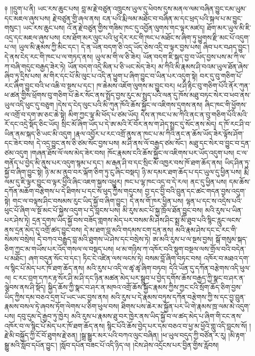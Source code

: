 \documentclass{article}
\begin{document}
༈ །།དྲུག་པ་ནི། ཡང་རས་ཆུང་པས། བླ་མ་རྗེ་བཙུན་འཁྲུངས་ཡུལ་དུ་ཕེབས་དུས་མནལ་ལམ་བཞིན་བྱུང་ངམ་ཡུམ་དང་མཇལ་ཞུས་པས། རྗེ་བཙུན་གྱི་ཞལ་ནས། ངན་པའི་རྨི་ལམ་མཐོང་བ་བཞིན་མ་དང་ཕྲད་པའི་སྐལ་པ་མ་བྱུང་གསུང་། ཡང་རས་ཆུང་པས། འོ་ན་རྗེ་བཙུན་གྱིས་གཟིམ་ཁང་དུ་འབྱོན་ལུགས་གང་ལྟར་མཛད། ཐོག་མར་ཡུལ་མི་ཇི་འདྲ་དང་མཇལ་ཞུས་པས། ངས་ཐོག་མར་ལུང་པའི་ཕུ་དེར་རང་གི་ཁང་པ་མཐོང་ས་ཞིག་ཏུ་ཕྱུགས་རྫི་མང་པོ་འདུག་པ་ལ། ཡུལ་མི་རྣམས་ཀྱི་མིང་དང་། དེ་ན་ཡོན་བདག་ཅི་འདྲ་ཡོད་ཅེས་འདྲི་བ་ལྟར་བྱས་པས། ཞིབ་པར་བཤད་བྱུང་། དེ་ནས་ངེད་རང་གི་ཁང་པ་ལ་གཏད་ནས། ཡུལ་མ་གི་ལ་ཅི་ཟེར། ཡོན་བདག་ཇི་སྐད་བྱ་བ་ཡོད་བྱས་པས་མ་ཀི་ལ་ཀ་བཞི་གདུང་བརྒྱད་ཟེར་ཏེ། ཡོན་བདག་འདྲེ་མིན་པ་ཅི་ཡང་མེད་ཟེར། མ་ཀིའི་མི་རྣམས་ཤི་བའམ་ཡུལ་ཐོན་ཞེས་ཞིབ་ཏུ་དྲིས་པས། མ་གིར་དང་པོ་མི་ལུང་པ་འདི་ན་ཕྱུག་པ་ཞིག་བྱུང་བ་ཡིན་པར་འདུག་སྟེ། བར་དུ་བུ་གཅིག་པོ་རང་ཞིག་བྱུང་བའི་ཕ་འཆི་བ་སྔས་པ་དང་། ཁ་ཆེམས་འཇོག་ལུགས་མ་བྱུང་བར། ཕ་ཤི་རྟིང་བུ་གཅིག་པོའི་ནོར་ཀུན་ཕ་ཚན་གྱིས་ཕྲོགས་བུ་གཅིག་པོ་ཆེར་སོང་ནས་སྤྲོད་བྱས་རུང་མ་སྤྲད་པའི་ལན་དུ་ཁོས་མཐུ་བཏང་སེར་བ་ཕབ་ནས་ཡུལ་འདི་ཕུང་དུ་བཅུག །དེས་ད་ངེད་ལུང་པའི་མི་ཀུན་ཁོའི་ཆོས་སྐྱོང་ལ་འཇིགས་དྲགས་ནས། ཞིང་ཁང་གི་ཕྱོགས་ལ་འགྲོ་བ་དག་ཨ་ཅང་ཆེ་སྟེ། མིག་ཀྱང་ལྟ་མི་ཕོད་པ་ཙམ་ཡོད། དེས་ན་ཁང་པ་མ་ཀིའི་ནང་ན་བུ་གཅིག་པོའི་མའི་རོ་དང་འདྲེ་སྡོད་ཅིང་ཡོད། སྲིང་མོ་ཞིག་ཡོད་པ་དེ་ཨ་མའི་རོ་བོར་ནས་ག་ཤེད་སྤྲང་དུ་སོང་ནས་མེད། ད་ཁོ་རང་ཤི་བ་ཡིན་ནམ་སྐད་ཅི་ཡང་མི་འདུག །རྣལ་འབྱོར་པ་རང་འགྲོ་ནུས་ན་ཁང་པ་མ་ཀིའི་ནང་ན་ཆོས་ཡོད་ཟེར་ལྟོས་ཤོག་དང་ཟེར་བས། དེ་འདྲ་བྱུང་ནས་ཅི་ཙམ་སོང་བྱས་པས། མ་ཤི་ནས་ལོ་བརྒྱད་ཙམ་སོང་། མཐུ་དང་སེར་བ་བྱུང་བ་དྲན་ཙམ་འདུག །གཞན་ཐོས་ལོ་ལས་མེད་ཟེར་བས། ཁོང་རྣམས་ངའི་ཆོས་སྐྱོང་ལ་འཇིགས་པར་ཡོད་འདུག་པས། ང་ལ་གནོད་པ་བྱེད་མི་ནུས་པར་འདུག་སྙམ་པ་དང་། མ་རྒན་ཤི་བ་དང་སྲིང་མོ་འཁྱར་བས་ཁོ་ཐག་ཆོད་ནས། ཡིད་ཤིན་ཏུ་སྐྱོ་བ་ཞིག་བྱུང་སྟེ། ཉི་མ་མ་ནུབ་བར་ལྐོག་ཅིག་ཏུ་ངུ་ཞིང་བསྡད། ཉི་མ་དམར་ཐག་ཆོད་པ་དང་ཡུལ་དུ་ཕྱིན་པས། རྨི་ལམ་དུ་ཇི་ལྟར་བྱུང་བ་ལྟར་ཕྱིའི་ཞིང་འཇག་སྐྱས་འཕྱུར། ཁང་པ་ལྷ་ཁང་འདྲ་བ་དེ་རལ། ནང་དུ་ཕྱིན་པས། དམ་ཆོས་དཀོན་མཆོག་བརྩེགས་པ་དེ་ཐིགས་པ་དང་ས་ཕུད་ཀྱིས་གདུངས། བྱ་དང་བྱི་བའི་བྲུན་དང་ཚང་གདན་བྱས་འདུག་སྟེ། གང་ལ་བལྟས་ཤིང་བསམས་རུང་ཡིད་སྐྱོ་བ་ཞིག་བྱུང་། དེ་ནས་གོ་ཁར་ཕྱིན་པས། ལྷན་པ་དང་ས་འདྲེས་པའི་ཕུང་པོ་ཞིག་ལ་སྔོ་མང་པོ་སྐྱེས་འདུག་པ་དེ་བླངས་པས། མི་རུས་མང་པོ་སྐྱ་ཁྲོལ་ཐོན་བྱུང་བས། མའི་རུས་པ་ཡིན་པར་ཤེས་ཏེ། དྲན་དྲགས་ཡིད་སྐྱོ་བས་བཟོད་གླགས་མེད་པར་བསམ་མི་ཤེས་ཤིང་སྨྲ་མི་ཐུབ་པའི་སྙིང་རླུང་ལངས་ནས་དྲན་མེད་དུ་འགྲོ་ཚད་བྱུང་བས། དེ་མ་ཐག་བླ་མའི་གདམས་ངག་དྲན་ནས། མའི་རྣམ་ཤེས་དང་ང་རང་གི་སེམས་བསྲེས། དེ་བཀའ་བརྒྱུད་བླ་མའི་ཐུགས་ཡེ་ཤེས་དང་བསྲེས་ཏེ། ཨ་མའི་རུས་པ་ལ་སྔས་བྱས། སྒོ་གསུམ་སྐད་ཅིག་ཀྱང་མ་གཡོས་པར་འོད་གསལ་ལ་བསྡད་པས། ཕ་མ་གཉིས་ཀ་འཁོར་བའི་སྡུག་བསྔལ་ལས་གྲོལ་བའི་བདེན་པ་མཐོང་། ཞག་བདུན་སོང་བ་དང་། ཏིང་ངེ་འཛིན་ལས་ལངས་ཏེ། བསམ་བློ་ཞིག་བཏང་བས། འཁོར་བ་མཐའ་དག་ལ་སྙིང་པོ་མེད་པར་ཁོ་ཐག་ཆོད་ནས། མའི་རུས་པ་འདི་ལ་ཚྭ་ཚྭ་ཞིག་བཏབ། དེའི་ཡོན་དུ་དཀོན་བརྩེགས་འདི་ཕུལ་ལ། ང་རང་བྲག་དཀར་རྟ་སོར་ཤི་མ་ཤི་དང་ཉིན་མཚན་མེད་པར་སྒྲུབ་པ་བྱེད་དགོས་ཆོས་བརྒྱད་ཀྱི་སྣང་བ་ཤར་ན་ལྕེབས་ནས་ཤི་སྡོད། སྐྱིད་ཆོས་ཀྱི་སྣང་བ་ཤར་ན་མཁའ་འགྲོ་ཆོས་སྐྱོང་རྣམས་ཀྱིས་ཀྱང་ངའི་སྲོག་ཆོད་ཅིག་བྱས་ཡིད་ཀྱིས་དམ་བཅའ་དྲག་པོ་ཡང་ཡང་བྱས་ནས། མའི་རུས་པ་དེ་རྣམས་བཏུས་དཀོན་བརྩེགས་ཀྱི་ས་དང་བྱ་བྲུན་རྣམས་བསལ་ཏེ་ཞབས་ཏོག་ལེགས་པ་ཅིག་ཕུལ་བས། ཐིགས་པས་ཆེར་མ་སྐྱོན་པར་ཡི་གེ་རྣམས་ཁྲ་ལམ་མེ་འདུག་པས། དབུ་དུམ་དེ་རྒྱབ་ཏུ་ཁྱེར། མའི་རུས་པ་རྣམས་ཐུ་བར་ཁྱེར་ནས་ཡིད་སྐྱོ་བ་ལ་ཚད་མེད་པ་ཞིག་གི་ངང་ནས་འཁོར་བ་ལ་སྙིང་པོ་མེད་པར་ཁོ་ཐག་ཆོད་ནས། སྙིང་པོའི་ཆོས་བྱེད་པར་དམ་བཅའ་བ་ཕྱ་མ་ཕྱོའི་གླུ་འདི་བླངས་སོ། །རྗེ་མི་བསྐྱོད་ཀྱི་ངོ་བོ་ཐུགས་རྗེ་ཅན། །སྒྲ་སྒྱུར་མར་པའི་བཀའ་ལུང་བཞིན། །ཕ་ཡུལ་བདུད་ཀྱི་བཙོན་ར་རུ། །མི་རྟག་སྒྱུ་མའི་སློབ་དཔོན་བྱུང་། །སློབ་དཔོན་བཟང་པོ་འདི་ཉིད་ལ། །ངེས་ཤེས་འདྲོངས་པར་བྱིན་གྱིས་རློབས། 
\end{document}
